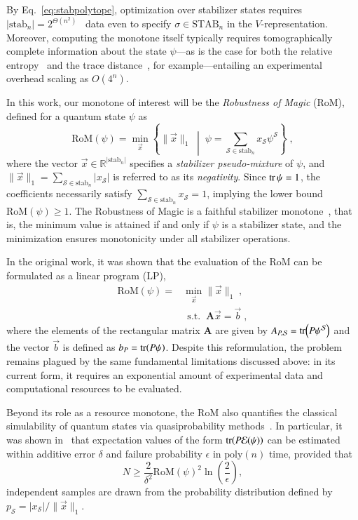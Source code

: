 \documentclass[10pt,aps,pra,twocolumn,floatfix,nofootinbib,superscriptaddress,longbibliography]{revtex4-2}
\newcommand{\1}{\mathbbm{1}}
\begin{document}
By Eq.~\eqref{eq:stabpolytope}, optimization over stabilizer states requires $|\mathrm{stab}_n| =2^{\Theta(n^2)}$~\cite{aaronson2004improved} data even to specify $\sigma \in \mathrm{STAB}_n$ in the $V$-representation. Moreover, computing the monotone itself typically requires tomographically complete information about the state $\psi$—as is the case for both the relative entropy~\cite{Veitch_2014} and the trace distance~\cite{junior2025geometric}, for example—entailing an experimental overhead scaling as $O(4^n)$.

In this work, our monotone of interest will be the \emph{Robustness of Magic} (RoM), defined for a quantum state $\psi$ as~\cite{howard2017application}
\begin{equation}
    \mathrm{RoM}(\psi) = \min_{\vec x} \left\{ \| \vec x\|_1 \;\middle|\; \psi=\sum_{\mathcal S \in \mathrm{stab}_n}x_\mathcal S \psi^\mathcal S \right\}\;, 
    \label{eq:RoM}
\end{equation}
where the vector $\vec x \in \mathbb R^{|\mathrm{stab}_n|}$ specifies a \emph{stabilizer pseudo-mixture} of $\psi$, and $\| \vec x\|_1 = \sum_{\mathcal S \in \mathrm{stab}_n}|x_\mathcal S|$ is referred to as its \emph{negativity}. Since $\tr \psi=1$, the coefficients necessarily satisfy $\sum_{\mathcal S \in \mathrm{stab}_n}x_\mathcal S =1$, implying the lower bound $\mathrm{RoM}(\psi)\geq 1$. The Robustness of Magic is a faithful stabilizer monotone~\cite{howard2017application}, that is, the minimum value is attained if and only if $\psi$ is a stabilizer state, and the minimization ensures monotonicity under all stabilizer operations.

In the original work, it was shown that the evaluation of the RoM can be formulated as a linear program (LP),
\begin{align}
     \mathrm{RoM}(\psi) =&\min_{\vec x} \| \vec x\|_1\;, \nonumber\\     &\:\:\mathrm{s.t.}\;\;  \mathbf A \vec x = \vec b \;,
\end{align}
where the elements of the rectangular matrix $\mathbf A$ are given by $A_{P,\mathcal S} = \tr(P \psi^\mathcal S)$ and the vector $\vec b$ is defined as $b_P = \tr(P \psi)$. Despite this reformulation, the problem remains plagued by the same fundamental limitations discussed above: in its current form, it requires an exponential amount of experimental data and computational resources to be evaluated.

Beyond its role as a resource monotone, the RoM also quantifies the classical simulability of quantum states via quasiprobability methods~\cite{pashayan2015estimating}. In particular, it was shown in~\cite{howard2017application} that expectation values of the form $\tr(P \mathcal E(\psi))$ can be estimated within additive error $\delta$ and failure probability $\epsilon$ in $\mathrm{poly}(n)$ time, provided that
\begin{equation}
    N \geq \frac{2}{\delta^2}\mathrm{RoM}(\psi)^2 \ln \left(\frac{2}{\epsilon}\right),
    \label{eq:RoMsamplecomp}
\end{equation}
independent samples are drawn from the probability distribution defined by $p_\mathcal S = |x_\mathcal S|/\|\vec x\|_1$.
\end{document}
